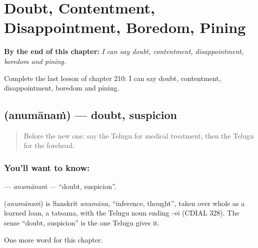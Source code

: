 
\chapter{Doubt, Contentment, Disappointment, Boredom, Pining}
\label{ch:te-doubt-contentment-disappointment-boredom-pining}

\begin{chapteropening}
\textbf{By the end of this chapter:} \emph{I can say doubt, contentment, disappointment, boredom and pining.}

Complete the last lesson of chapter 210: I can say doubt, contentment, disappointment, boredom and pining.
\end{chapteropening}

\section[\texorpdfstring{\te{అనుమానం} (anumānaṁ)}{అనుమానం (anumānaṁ)}]{ (anumānaṁ) — doubt, suspicion}

\label{lesson:TE-C210-anumanam}



\begin{quote}
Before the new one: say the Telugu for medical treatment, then the Telugu for the forehead.
\end{quote}

\subsection*{You'll want to know: }
\textbf{} — \emph{anumānaṁ} — \textquotedblleft{}doubt, suspicion\textquotedblright{}.

\begin{cousinweb}
\textbf{} (\emph{anumānaṁ}) is Sanskrit \emph{anumāna}, \textquotedblleft{}inference, thought\textquotedblright{}, taken over whole as a learned loan, a tatsama, with the Telugu noun ending \emph{-ṁ} (CDIAL 328). The sense \textquotedblleft{}doubt, suspicion\textquotedblright{} is the one Telugu gives it.
\end{cousinweb}

\begin{grammarlens}[title={What you've built}]
One more word for this chapter.
\end{grammarlens}

